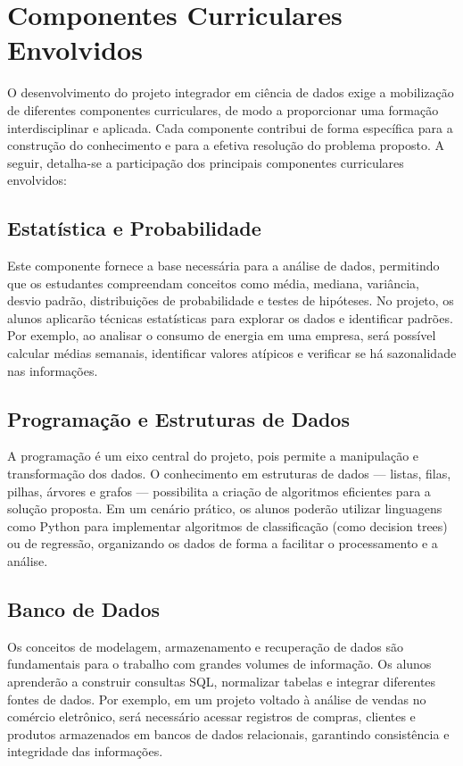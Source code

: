 \section{Componentes Curriculares Envolvidos}

O desenvolvimento do projeto integrador em ciência de dados exige a mobilização de diferentes componentes curriculares, de modo a proporcionar uma formação interdisciplinar e aplicada. Cada componente contribui de forma específica para a construção do conhecimento e para a efetiva resolução do problema proposto. A seguir, detalha-se a participação dos principais componentes curriculares envolvidos:

    \subsection{Estatística e Probabilidade}
    
        Este componente fornece a base necessária para a análise de dados, permitindo que os estudantes compreendam conceitos como média, mediana, variância, desvio padrão, distribuições de probabilidade e testes de hipóteses. No projeto, os alunos aplicarão técnicas estatísticas para explorar os dados e identificar padrões. Por exemplo, ao analisar o consumo de energia em uma empresa, será possível calcular médias semanais, identificar valores atípicos e verificar se há sazonalidade nas informações.
    
    \subsection{Programação e Estruturas de Dados}
    
        A programação é um eixo central do projeto, pois permite a manipulação e transformação dos dados. O conhecimento em estruturas de dados — listas, filas, pilhas, árvores e grafos — possibilita a criação de algoritmos eficientes para a solução proposta. Em um cenário prático, os alunos poderão utilizar linguagens como Python para implementar algoritmos de classificação (como decision trees) ou de regressão, organizando os dados de forma a facilitar o processamento e a análise.

    \subsection{Banco de Dados}
        Os conceitos de modelagem, armazenamento e recuperação de dados são fundamentais para o trabalho com grandes volumes de informação. Os alunos aprenderão a construir consultas SQL, normalizar tabelas e integrar diferentes fontes de dados. Por exemplo, em um projeto voltado à análise de vendas no comércio eletrônico, será necessário acessar registros de compras, clientes e produtos armazenados em bancos de dados relacionais, garantindo consistência e integridade das informações.

